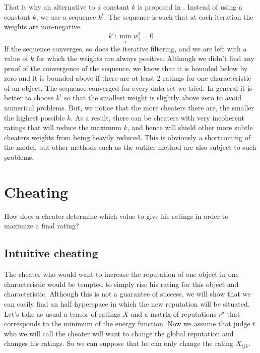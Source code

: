 \documentclass[12pt,a4paper]{article}
\begin{document}
That is why an alternative to a constant $k$ is proposed in \cite{Cristo1}. Instead of using a constant $k$, we use a sequence $k^t$. The sequence is such that at each iteration the weights are non-negative.
$$ k^t : \min_i w_i^t = 0$$
If the sequence converges, so does the iterative filtering, and we are left with a value of $k$ for which the weights are always positive.
Although we didn't find any proof of the convergence of the sequence, we know that it is bounded below by zero and it is bounded above if there are at least 2 ratings for one characteristic of an object.	The sequence converged for every data set we tried. In general it is better to choose $k^t$ so that the smallest weight is slightly above zero to avoid numerical problems.
But, we notice that the more cheaters there are, the smaller the highest possible $k$. As a result, there can be cheaters with very incoherent ratings that will reduce the maximum $k$, and hence will shield other more subtle cheaters weights from being heavily reduced.
This is obviously a shortcoming of the model, but other methods such as the outlier method are also subject to such problems.

\section{Cheating}
How does a cheater determine which value to give his ratings in order to maximize a final rating? 
\subsection{Intuitive cheating}

The cheater who would want to increase the reputation of one object in one characteristic would be tempted to simply rise his rating for this object and characteristic. Although this is not a guarantee of success, we will show that we can easily find an half hyperspace in which the new reputation will be situated.\\

Let's take as usual a tensor of ratings $X$ and a matrix of reputations $r^{\star}$ that corresponds to the minimum of the energy function. Now we assume that judge $t$ who we will call the cheater will want to change the global reputation and changes his ratings. So we can suppose that he can only change the rating $X_{tjk}$. 
\end{document}
